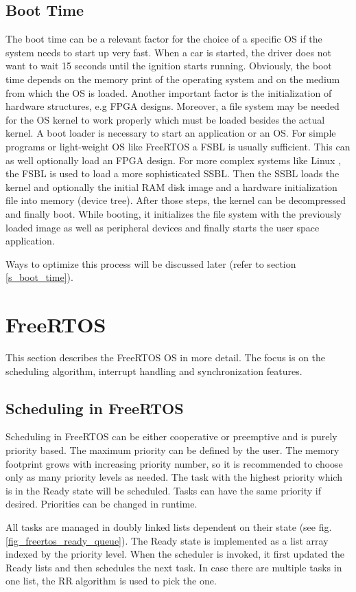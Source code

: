 \subsection{Boot Time}\label{ss_boot_time_general}
The boot time can be a relevant factor for the choice of a specific \ac{OS} if the system needs to start up very fast.
When a car is started, the driver does not want to wait 15 seconds until the ignition starts running.
Obviously, the boot time depends on the memory print of the operating system and on the medium from which the \ac{OS} is loaded.
Another important factor is the initialization of hardware structures, e.g \ac{FPGA} designs.
Moreover, a file system may be needed for the \ac{OS} kernel to work properly which must be loaded besides the actual kernel. 
A boot loader is necessary to start an application or an \ac{OS}.
For simple programs or light-weight \ac{OS} like FreeRTOS a \ac{FSBL} is usually sufficient.
This can as well optionally load an \ac{FPGA} design.
For more complex systems like Linux \cite{jones:itlbp}, the \ac{FSBL} is used to load a more sophisticated \ac{SSBL}.
Then the \ac{SSBL} loads the kernel and optionally the initial RAM disk image and a hardware initialization file into memory (device tree).
After those steps, the kernel can be decompressed and finally boot.
While booting, it initializes the file system with the previously loaded image as well as peripheral devices and finally starts the user space application. 
\par
Ways to optimize this process will be discussed later (refer to section \ref{s_boot_time}).

\section{FreeRTOS}
This section describes the FreeRTOS \ac{OS} in more detail.
The focus is on the scheduling algorithm, interrupt handling and synchronization features.

\subsection{Scheduling in FreeRTOS}\label{ss_scheduling_in_freertos}
Scheduling in FreeRTOS \cite{freertos} can be either cooperative or preemptive and is purely priority based.
The maximum priority can be defined by the user. 
The memory footprint grows with increasing priority number, so it is recommended to choose only as many priority levels as needed.
The task with the highest priority which is in the Ready state will be scheduled. 
Tasks can have the same priority if desired.
Priorities can be changed in runtime.
\par
All tasks are managed in doubly linked lists dependent on their state (see fig. \ref{fig_freertos_ready_queue}). 
The Ready state is implemented as a list array indexed by the priority level. 
When the scheduler is invoked, it first updated the Ready lists and then schedules the next task.
In case there are multiple tasks in one list, the \ac{RR} algorithm is used to pick the one.

